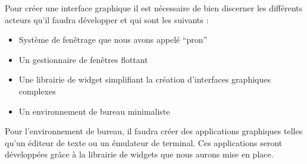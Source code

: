 Pour créer une interface graphique il est nécessaire de bien discerner les différents acteurs qu'il faudra développer et qui sont les suivants :

\begin{itemize}
\renewcommand{\labelitemi}{$\bullet$}
\item Système de fenêtrage que nous avons appelé ``pron''
\item Un gestionnaire de fenêtres flottant
\item Une librairie de widget simplifiant la création d'interfaces graphiques complexes
\item Un environnement de bureau minimaliste
\end{itemize}

Pour l'environnement de bureau, il faudra créer des applications graphiques telles qu'un éditeur de texte ou un émulateur de terminal. Ces applications seront développées grâce à la librairie de widgets que nous aurons mise en place.